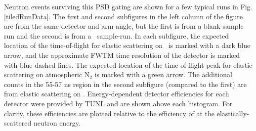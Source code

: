 Neutron events surviving this PSD gating are shown for a few typical runs in Fig. 
\ref{tiledRunData}. The first and second subfigures in the left column of the figure are from 
the same detector and arm angle, but the first is from a blank-sample run and
the second is from a \snFour\ sample-run. In each subfigure, the expected location
of the time-of-flight for elastic scattering on \snFour\ is marked with a dark blue arrow,
and the approximate FWTM time
resolution of the detector is marked with blue dashed lines. The expected
location of the time-of-flight peak for elastic scattering on atmospheric
N$_{2}$ is marked with a green arrow. The additional counts in the 55-57 ns region in
the second subfigure (compared to the first) are from elastic scattering on
\snFour. Energy-dependent detector efficiencies for each detector were provided by TUNL
and are shown above each histogram. For clarity, these efficiencies are plotted
relative to the efficiency of at the elastically-scattered neutron energy.

